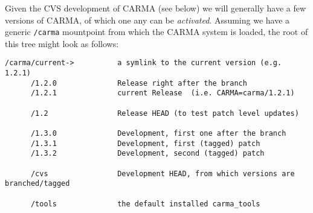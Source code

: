 \documentclass{article}
\begin{document}
Given the CVS development of CARMA (see below) we will generally
have a few versions of CARMA, of which one
any can be {\it activated}. Assuming we
have a generic {\tt /carma} mountpoint from which the CARMA system
is loaded, the root of this tree might look as follows:


\begin{verbatim}
/carma/current->          a symlink to the current version (e.g. 1.2.1)
      /1.2.0              Release right after the branch
      /1.2.1              current Release  (i.e. CARMA=carma/1.2.1)

      /1.2                Release HEAD (to test patch level updates)

      /1.3.0              Development, first one after the branch
      /1.3.1              Development, first (tagged) patch
      /1.3.2              Development, second (tagged) patch

      /cvs                Development HEAD, from which versions are branched/tagged

      /tools              the default installed carma_tools

\end{verbatim}
\end{document}
